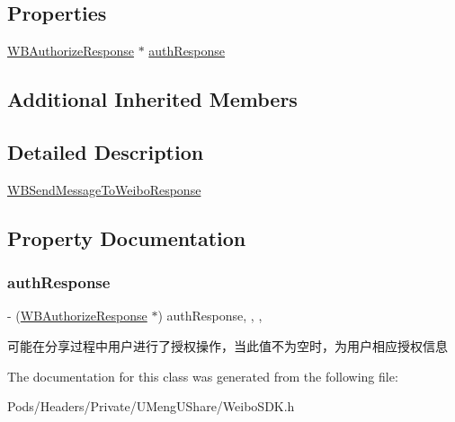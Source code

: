 \subsection*{Properties}
\begin{DoxyCompactItemize}
\item 
\mbox{\hyperlink{interface_w_b_authorize_response}{W\+B\+Authorize\+Response}} $\ast$ \mbox{\hyperlink{interface_w_b_send_message_to_weibo_response_ab5ea47a5ccfcff012c769dc612da2c72}{auth\+Response}}
\end{DoxyCompactItemize}
\subsection*{Additional Inherited Members}


\subsection{Detailed Description}
\mbox{\hyperlink{interface_w_b_send_message_to_weibo_response}{W\+B\+Send\+Message\+To\+Weibo\+Response}} 

\subsection{Property Documentation}
\mbox{\label{interface_w_b_send_message_to_weibo_response_ab5ea47a5ccfcff012c769dc612da2c72}} 
\subsubsection{\texorpdfstring{auth\+Response}{authResponse}}
{\footnotesize\ttfamily -\/ (\mbox{\hyperlink{interface_w_b_authorize_response}{W\+B\+Authorize\+Response}} $\ast$) auth\+Response\hspace{0.3cm}{\ttfamily [read]}, {\ttfamily [write]}, {\ttfamily [nonatomic]}, {\ttfamily [strong]}}

可能在分享过程中用户进行了授权操作，当此值不为空时，为用户相应授权信息 

The documentation for this class was generated from the following file\+:\begin{DoxyCompactItemize}
\item 
Pods/\+Headers/\+Private/\+U\+Meng\+U\+Share/Weibo\+S\+D\+K.\+h\end{DoxyCompactItemize}
